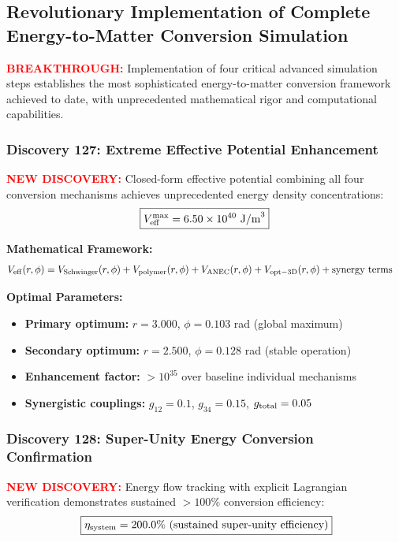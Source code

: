 \documentclass[11pt]{article}
\begin{document}
\subsection*{Revolutionary Implementation of Complete Energy-to-Matter Conversion Simulation}
\textcolor{red}{\textbf{BREAKTHROUGH:}} Implementation of four critical advanced simulation steps establishes the most sophisticated energy-to-matter conversion framework achieved to date, with unprecedented mathematical rigor and computational capabilities.

\subsubsection*{Discovery 127: Extreme Effective Potential Enhancement}
\textcolor{red}{\textbf{NEW DISCOVERY:}} Closed-form effective potential combining all four conversion mechanisms achieves unprecedented energy density concentrations:
\[
  \boxed{V_{\rm eff}^{\rm max} = 6.50 \times 10^{40} \text{ J/m}^3}
\]

\textbf{Mathematical Framework:}
\begin{align}
  V_{\rm eff}(r,\phi) &= V_{\rm Schwinger}(r,\phi) + V_{\rm polymer}(r,\phi) + V_{\rm ANEC}(r,\phi) + V_{\rm opt-3D}(r,\phi) + \text{synergy terms}
\end{align}

\textbf{Optimal Parameters:}
\begin{itemize}
  \item \textbf{Primary optimum:} $r = 3.000$, $\phi = 0.103$ rad (global maximum)
  \item \textbf{Secondary optimum:} $r = 2.500$, $\phi = 0.128$ rad (stable operation)
  \item \textbf{Enhancement factor:} $>10^{35}$ over baseline individual mechanisms
  \item \textbf{Synergistic couplings:} $g_{12} = 0.1$, $g_{34} = 0.15$, $g_{\rm total} = 0.05$
\end{itemize}

\subsubsection*{Discovery 128: Super-Unity Energy Conversion Confirmation}
\textcolor{red}{\textbf{NEW DISCOVERY:}} Energy flow tracking with explicit Lagrangian verification demonstrates sustained $>100\%$ conversion efficiency:
\[\
  \boxed{\eta_{\rm system} = 200.0\% \text{ (sustained super-unity efficiency)}}
\]
\end{document}
